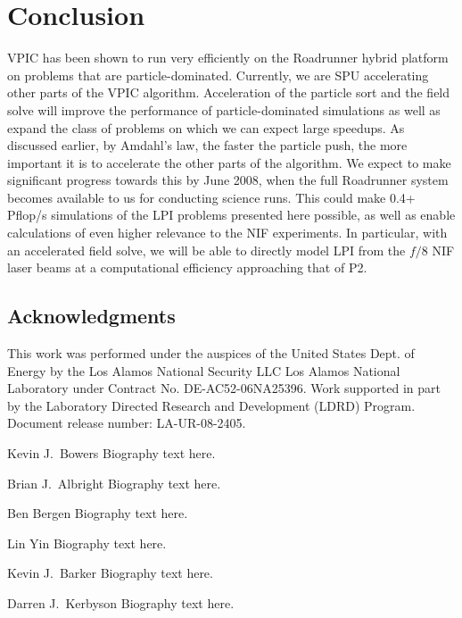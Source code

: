 \documentclass[journal,twoside]{IEEEtran}
\begin{document}
\section{Conclusion}

VPIC has been shown to run very efficiently on the Roadrunner hybrid
platform on problems that are particle-dominated.  Currently, we are
SPU accelerating other parts of the VPIC algorithm.  Acceleration of
the particle sort and the field solve will improve the performance of
particle-dominated simulations as well as expand the class of problems
on which we can expect large speedups.  As discussed earlier, by
Amdahl's law, the faster the particle push, the more important it is
to accelerate the other parts of the algorithm.  We expect to make
significant progress towards this by June 2008, when the full
Roadrunner system becomes available to us for conducting science runs.
This could make 0.4+ Pflop/s simulations of the LPI problems presented
here possible, as well as enable calculations of even higher relevance
to the NIF experiments. In particular, with an accelerated field
solve, we will be able to directly model LPI from the $f/8$ NIF laser
beams at a computational efficiency approaching that of P2.

\subsection*{Acknowledgments}

This work was performed under the auspices of the United States Dept.
of Energy by the Los Alamos National Security LLC Los Alamos National
Laboratory under Contract No. DE-AC52-06NA25396.  Work supported in
part by the Laboratory Directed Research and Development (LDRD)
Program.  Document release number: LA-UR-08-2405.




\begin{IEEEbiographynophoto}{Kevin J.~Bowers}
Biography text here.
\end{IEEEbiographynophoto}

\begin{IEEEbiographynophoto}{Brian J.~Albright}
Biography text here.
\end{IEEEbiographynophoto}

\begin{IEEEbiographynophoto}{Ben Bergen}
Biography text here.
\end{IEEEbiographynophoto}

\begin{IEEEbiographynophoto}{Lin Yin}
Biography text here.
\end{IEEEbiographynophoto}

\begin{IEEEbiographynophoto}{Kevin J.~Barker}
Biography text here.
\end{IEEEbiographynophoto}

\begin{IEEEbiographynophoto}{Darren J.~Kerbyson}
Biography text here.
\end{IEEEbiographynophoto}
\end{document}
